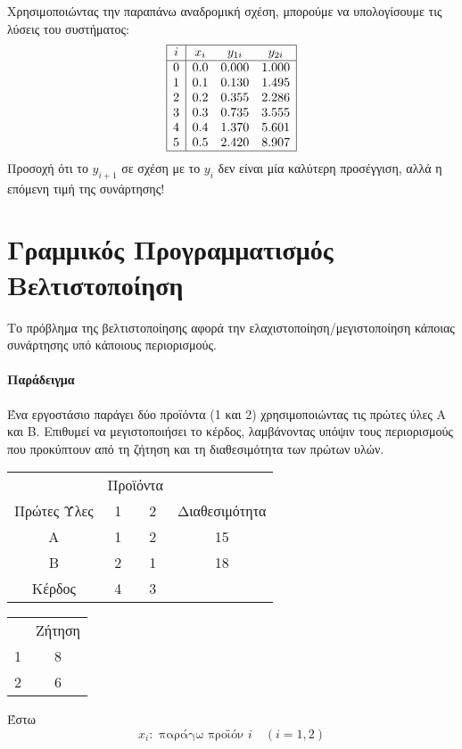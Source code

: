 \documentclass[11pt,a4paper,notitlepage,fleqn,final]{article}
\begin{document}
Χρησιμοποιώντας την παραπάνω αναδρομική σχέση, μπορούμε να υπολογίσουμε
τις λύσεις του συστήματος:
\[
\begin{array}{|c|ccc|}
\hline i & x_i & y_{1i} & y_{2i} \\ \hline
0 & 0.0 & 0.000 & 1.000 \\
1 & 0.1 & 0.130 & 1.495 \\
2 & 0.2 & 0.355 & 2.286 \\
3 & 0.3 & 0.735 & 3.555 \\
4 & 0.4 & 1.370 & 5.601 \\
5 & 0.5 & 2.420 & 8.907 \\ \hline
\end{array}
\]
Προσοχή ότι το \( y_{i+1} \) σε σχέση με το \( y_i \) δεν είναι μία
καλύτερη προσέγγιση, αλλά η επόμενη τιμή της συνάρτησης!

\setcounter{section}{9}
\section[Γραμμικός Προγραμματισμός \& Βελτιστοποίηση]%
{Γραμμικός Προγραμματισμός\\Βελτιστοποίηση}
Το πρόβλημα της βελτιστοποίησης αφορά την ελαχιστοποίηση/μεγιστοποίηση κάποιας συνάρτησης
υπό κάποιους περιορισμούς.
\paragraph{Παράδειγμα}
Ένα εργοστάσιο παράγει δύο προϊόντα (1 και 2) χρησιμοποιώντας τις πρώτες ύλες Α και Β.
Επιθυμεί να μεγιστοποιήσει το κέρδος, λαμβάνοντας υπόψιν τους περιορισμούς που προκύπτουν
από τη ζήτηση και τη διαθεσιμότητα των πρώτων υλών.

\begin{tabular}{c|c|c|c}
	& \multicolumn{2}{c|}{Προϊόντα} &  \\
	Πρώτες Ύλες & 1 & 2 & Διαθεσιμότητα \\
	\hline
	Α & 1 & 2 & 15 \\
	\hline
	Β & 2 & 1 & 18 \\
	\hline
	Κέρδος & 4 & 3 &  \\
\end{tabular}
\begin{tabular}{c|c}
	& Ζήτηση \\
	1 & 8 \\
	\hline
	2 & 6 \\
\end{tabular}

Έστω
\[
x_i: \text{ παράγω προϊόν } i \quad (i=1,2)
\]
\end{document}
